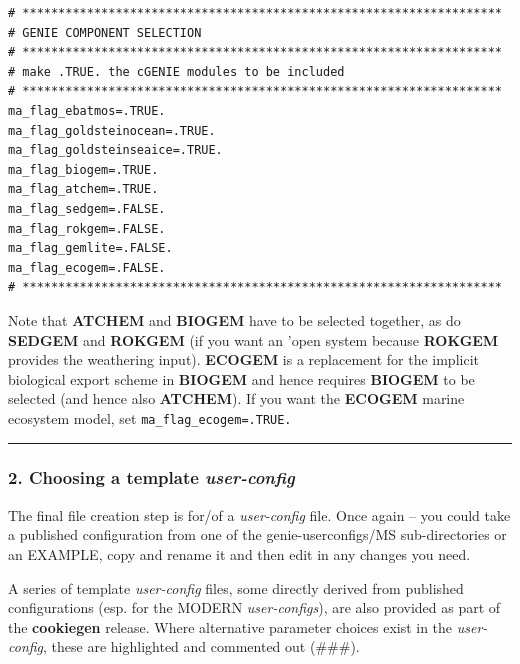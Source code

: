 \footnotesize\vspace{-2pt}\begin{verbatim}
# *******************************************************************
# GENIE COMPONENT SELECTION
# *******************************************************************
# make .TRUE. the cGENIE modules to be included
# *******************************************************************
ma_flag_ebatmos=.TRUE.
ma_flag_goldsteinocean=.TRUE.
ma_flag_goldsteinseaice=.TRUE.
ma_flag_biogem=.TRUE.
ma_flag_atchem=.TRUE.
ma_flag_sedgem=.FALSE.
ma_flag_rokgem=.FALSE.
ma_flag_gemlite=.FALSE.
ma_flag_ecogem=.FALSE.
# *******************************************************************
\end{verbatim}\vspace{-2pt}\normalsize

\noindent Note that \textbf{ATCHEM} and \textbf{BIOGEM} have to be selected together, as do \textbf{SEDGEM} and \textbf{ROKGEM} (if you want an 'open system because \textbf{ROKGEM} provides the weathering input). \textbf{ECOGEM} is a replacement for the implicit biological export scheme in \textbf{BIOGEM} and hence requires \textbf{BIOGEM} to be selected (and hence also \textbf{ATCHEM}). If you want the \textbf{ECOGEM} marine ecosystem model, set \texttt{ma\_flag\_ecogem=.TRUE.}

\vspace{1mm}\noindent\rule{4cm}{0.5pt}\vspace{2mm}

\newpage 
%
\subsubsection{2. Choosing a template \textit{user-config}}

The final file creation step is for/of a \textit{user-config} file. Once again -- you could take a published configuration from one of the \textsf{\footnotesize genie-userconfigs/MS} sub-directories or an EXAMPLE, copy and rename it and then edit in any changes you need.

A series of template \textit{user-config} files, some directly derived from published configurations (esp. for the MODERN \textit{user-configs}), are also provided as part of the \textbf{cookiegen} release. Where alternative parameter choices exist in the \textit{user-config}, these are highlighted and commented out (\#\#\#).

